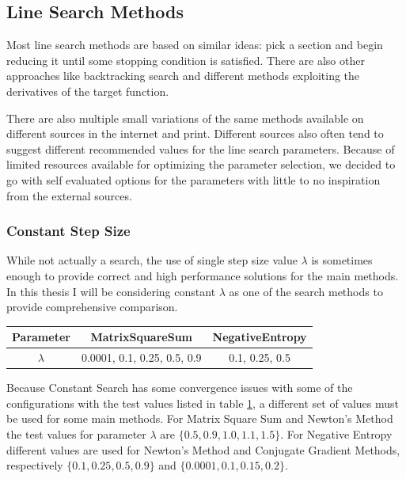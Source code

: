 \documentclass[a4paper,english,titlepage,12pt]{article}
\newcommand{\todoinline}{\todo[inline,color=green!40]}
\begin{document}
\todoinline{Add HBM parameters table}


\subsection{Line Search Methods}
\label{sect:line_search_methods}


Most line search methods are based on similar ideas: pick a section and begin reducing it until some stopping condition is satisfied. There are also other approaches like backtracking search and different methods exploiting the derivatives of the target function.

There are also multiple small variations of the same methods available on different sources in the internet and print. Different sources also often tend to suggest different recommended values for the line search parameters. Because of limited resources available for optimizing the parameter selection, we decided to go with self evaluated options for the parameters with little to no inspiration from the external sources. \cite{book:convex_optimization} \cite{book:nonlinear_programming} 


\subsubsection{Constant Step Size}


While not actually a search, the use of single step size value $\lambda$ is sometimes enough to provide correct and high performance solutions for the main methods. In this thesis I will be considering constant $\lambda$ as one of the search methods to provide comprehensive comparison.

\begin{table}[H]
\label{tab:params_ConstantSearch}
\centering
{}
\begin{tabular}{|c|c|c|}
\hline
\rowcolor{gray!25}
Parameter & MatrixSquareSum & NegativeEntropy \\
\hline
$\lambda$ & 0.0001, 0.1, 0.25, 0.5, 0.9 & 0.1, 0.25, 0.5 \\
\hline
\end{tabular}
\end{table}

Because Constant Search has some convergence issues with some of the configurations with the test values listed in table \ref{tab:params_ConstantSearch}, a different set of values must be used for some main methods. For Matrix Square Sum and Newton's Method the test values for parameter $\lambda$ are $\{0.5, 0.9, 1.0, 1.1, 1.5\}$. For Negative Entropy different values are used for Newton's Method and Conjugate Gradient Methods, respectively $\{0.1, 0.25, 0.5, 0.9\}$ and $\{0.0001, 0.1, 0.15, 0.2\}$.
\end{document}
